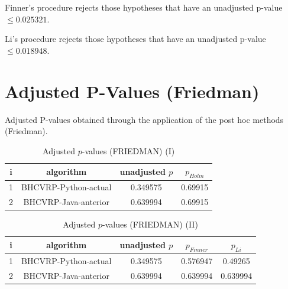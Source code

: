 \documentclass[a4paper,10pt]{article}
\begin{document}
\begin{landscape}
Finner's procedure rejects those hypotheses that have an unadjusted p-value $\le0.025321$.

Li's procedure rejects those hypotheses that have an unadjusted p-value $\le0.018948$.


\newpage

\section{Adjusted P-Values (Friedman)}


Adjusted P-values obtained through the application of the post hoc methods (Friedman).

\begin{table}[!htp]
\centering\small
\begin{tabular}{cccc}
i&algorithm&unadjusted $p$&$p_{Holm}$\\
\hline1&BHCVRP-Python-actual&0.349575&0.69915\\2&BHCVRP-Java-anterior&0.639994&0.69915\\\hline
\end{tabular}
\caption{Adjusted $p$-values (FRIEDMAN) (I)}
\end{table}
\begin{table}[!htp]
\centering\small
\begin{tabular}{ccccc}
i&algorithm&unadjusted $p$&$p_{Finner}$&$p_{Li}$\\
\hline1&BHCVRP-Python-actual&0.349575&0.576947&0.49265\\2&BHCVRP-Java-anterior&0.639994&0.639994&0.639994\\\hline
\end{tabular}
\caption{Adjusted $p$-values (FRIEDMAN) (II)}
\end{table}

\newpage
\end{landscape}
\end{document}

